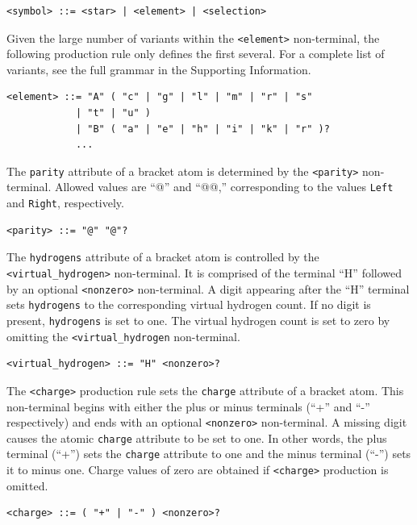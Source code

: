 \documentclass{article}
\def\ttt{\texttt}
\begin{document}
\begin{lstlisting}
<symbol> ::= <star> | <element> | <selection>
\end{lstlisting}

Given the large number of variants within the \ttt{<element>} non-terminal, the following production rule only defines the first several. For a complete list of variants, see the full grammar in the Supporting Information.

\begin{lstlisting}
<element> ::= "A" ( "c" | "g" | "l" | "m" | "r" | "s"
            | "t" | "u" )
            | "B" ( "a" | "e" | "h" | "i" | "k" | "r" )?
            ...
\end{lstlisting}

The \ttt{parity} attribute of a bracket atom is determined by the \ttt{<parity>} non-terminal. Allowed values are \enquote{@} and \enquote{@@,} corresponding to the values \ttt{Left} and \ttt{Right}, respectively.

\begin{lstlisting}
<parity> ::= "@" "@"?
\end{lstlisting}

The \ttt{hydrogens} attribute of a bracket atom is controlled by the \\ \ttt{<virtual{\_}hydrogen>} non-terminal. It is comprised of the terminal \enquote{H} followed by an optional \ttt{<nonzero>} non-terminal. A digit appearing after the \enquote{H} terminal sets \ttt{hydrogens} to the corresponding virtual hydrogen count. If no digit is present, \ttt{hydrogens} is set to one. The virtual hydrogen count is set to zero by omitting the \ttt{<virtual{\_}hydrogen} non-terminal.

\begin{lstlisting}
<virtual_hydrogen> ::= "H" <nonzero>?
\end{lstlisting}

The \ttt{<charge>} production rule sets the \ttt{charge} attribute of a bracket atom. This non-terminal begins with either the plus or minus terminals (\enquote{+} and \enquote{-} respectively) and ends with an optional \ttt{<nonzero>} non-terminal. A missing digit causes the atomic \ttt{charge} attribute to be set to one. In other words, the plus terminal (\enquote{+}) sets the \ttt{charge} attribute to one and the minus terminal (\enquote{-}) sets it to minus one. Charge values of zero are obtained if \ttt{<charge>} production is omitted.

\begin{lstlisting}
<charge> ::= ( "+" | "-" ) <nonzero>?
\end{lstlisting}
\end{document}
